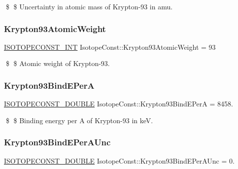 \$ \$ Uncertainty in atomic mass of Krypton-\/93 in amu. \mbox{\label{group___isotope_const-_krypton-_kr93_gab248263936d1790347a4a6ba837237ef}} 
\subsubsection{\texorpdfstring{Krypton93\+Atomic\+Weight}{Krypton93AtomicWeight}}
{\footnotesize\ttfamily \mbox{\hyperlink{group___isotope_const-_macros_ga5f18360b3e99483a35c32d789e62621c}{I\+S\+O\+T\+O\+P\+E\+C\+O\+N\+S\+T\+\_\+\+I\+NT}} Isotope\+Const\+::\+Krypton93\+Atomic\+Weight = 93}

\$ \$ Atomic weight of Krypton-\/93. \mbox{\label{group___isotope_const-_krypton-_kr93_ga20011cf42ad32adff1cc835c751d1ef3}} 
\subsubsection{\texorpdfstring{Krypton93\+Bind\+E\+PerA}{Krypton93BindEPerA}}
{\footnotesize\ttfamily \mbox{\hyperlink{group___isotope_const-_macros_ga8f45a7272ce02c0b4c65c44636ed719a}{I\+S\+O\+T\+O\+P\+E\+C\+O\+N\+S\+T\+\_\+\+D\+O\+U\+B\+LE}} Isotope\+Const\+::\+Krypton93\+Bind\+E\+PerA = 8458.}

\$ \$ Binding energy per A of Krypton-\/93 in keV. \mbox{\label{group___isotope_const-_krypton-_kr93_ga8dc45219499caa3d8e4f8d0579df9e22}} 
\subsubsection{\texorpdfstring{Krypton93\+Bind\+E\+Per\+A\+Unc}{Krypton93BindEPerAUnc}}
{\footnotesize\ttfamily \mbox{\hyperlink{group___isotope_const-_macros_ga8f45a7272ce02c0b4c65c44636ed719a}{I\+S\+O\+T\+O\+P\+E\+C\+O\+N\+S\+T\+\_\+\+D\+O\+U\+B\+LE}} Isotope\+Const\+::\+Krypton93\+Bind\+E\+Per\+A\+Unc = 0.}

